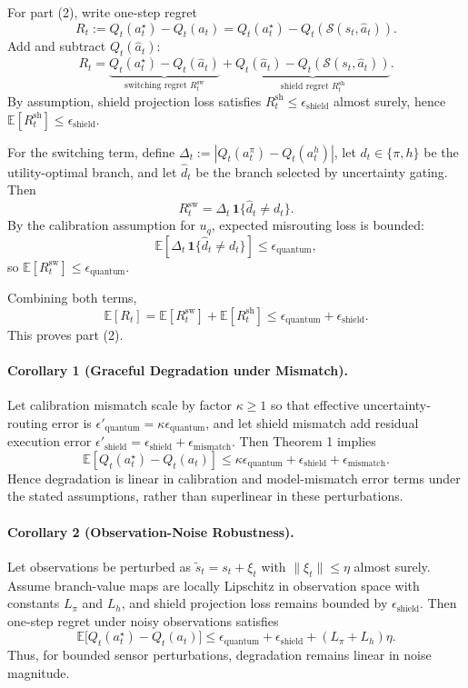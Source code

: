For part (2), write one-step regret
\[
R_t := Q_t(a_t^{\star})-Q_t(a_t)=Q_t(a_t^{\star})-Q_t(\mathcal{S}(s_t,\hat a_t)).
\]
Add and subtract $Q_t(\hat a_t)$:
\[
R_t=\underbrace{Q_t(a_t^{\star})-Q_t(\hat a_t)}_{\text{switching regret }R_t^{\mathrm{sw}}}
+\underbrace{Q_t(\hat a_t)-Q_t(\mathcal{S}(s_t,\hat a_t))}_{\text{shield regret }R_t^{\mathrm{sh}}}.
\]
By assumption, shield projection loss satisfies $R_t^{\mathrm{sh}}\le \epsilon_{\text{shield}}$ almost surely, hence $\mathbb{E}[R_t^{\mathrm{sh}}]\le \epsilon_{\text{shield}}$.

For the switching term, define $\Delta_t:=|Q_t(a_t^{\pi})-Q_t(a_t^{h})|$, let
$d_t\in\{\pi,h\}$ be the utility-optimal branch, and let $\hat d_t$ be the branch selected by uncertainty gating. Then
\[
R_t^{\mathrm{sw}} = \Delta_t\,\mathbf{1}\{\hat d_t\neq d_t\}.
\]
By the calibration assumption for $u_q$, expected misrouting loss is bounded:
\[
\mathbb{E}[\Delta_t\,\mathbf{1}\{\hat d_t\neq d_t\}]\le\epsilon_{\text{quantum}},
\]
so $\mathbb{E}[R_t^{\mathrm{sw}}]\le\epsilon_{\text{quantum}}$.

Combining both terms,
\[
\mathbb{E}[R_t]
=\mathbb{E}[R_t^{\mathrm{sw}}]+\mathbb{E}[R_t^{\mathrm{sh}}]
\le \epsilon_{\text{quantum}}+\epsilon_{\text{shield}}.
\]
This proves part (2).

\paragraph{Corollary 1 (Graceful Degradation under Mismatch).}
Let calibration mismatch scale by factor $\kappa\ge 1$ so that effective uncertainty-routing error is $\epsilon'_{\text{quantum}}=\kappa\epsilon_{\text{quantum}}$, and let shield mismatch add residual execution error $\epsilon'_{\text{shield}}=\epsilon_{\text{shield}}+\epsilon_{\text{mismatch}}$. Then Theorem 1 implies
\[
\mathbb{E}[Q_t(a_t^{\star})-Q_t(a_t)]
\le
\kappa\epsilon_{\text{quantum}}+\epsilon_{\text{shield}}+\epsilon_{\text{mismatch}}.
\]
Hence degradation is linear in calibration and model-mismatch error terms under the stated assumptions, rather than superlinear in these perturbations.

\paragraph{Corollary 2 (Observation-Noise Robustness).}
Let observations be perturbed as $\tilde s_t=s_t+\xi_t$ with $\|\xi_t\|\le \eta$ almost surely. Assume branch-value maps are locally Lipschitz in observation space with constants $L_{\pi}$ and $L_h$, and shield projection loss remains bounded by $\epsilon_{\text{shield}}$. Then one-step regret under noisy observations satisfies
\[
\mathbb{E}\big[Q_t(a_t^{\star})-Q_t(a_t)\big]
\le
\epsilon_{\text{quantum}}+\epsilon_{\text{shield}}+(L_{\pi}+L_h)\eta.
\]
Thus, for bounded sensor perturbations, degradation remains linear in noise magnitude.


